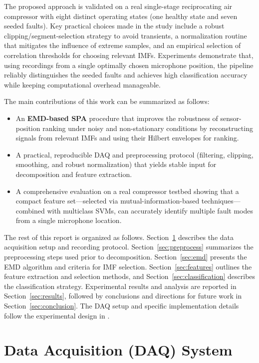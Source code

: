 \documentclass[12pt,a4paper]{article}
\begin{document}
The proposed approach is validated on a real single-stage reciprocating air compressor with eight distinct operating states (one healthy state and seven seeded faults). Key practical choices made in the study include a robust clipping/segment-selection strategy to avoid transients, a normalization routine that mitigates the influence of extreme samples, and an empirical selection of correlation thresholds for choosing relevant IMFs. Experiments demonstrate that, using recordings from a single optimally chosen microphone position, the pipeline reliably distinguishes the seeded faults and achieves high classification accuracy while keeping computational overhead manageable.

The main contributions of this work can be summarized as follows:
\begin{itemize}
  \item An \textbf{EMD-based SPA} procedure that improves the robustness of sensor-position ranking under noisy and non-stationary conditions by reconstructing signals from relevant IMFs and using their Hilbert envelopes for ranking.
  \item A practical, reproducible DAQ and preprocessing protocol (filtering, clipping, smoothing, and robust normalization) that yields stable input for decomposition and feature extraction.
  \item A comprehensive evaluation on a real compressor testbed showing that a compact feature set—selected via mutual-information-based techniques—combined with multiclass SVMs, can accurately identify multiple fault modes from a single microphone location.
\end{itemize}

The rest of this report is organized as follows. Section~\ref{sec:daq} describes the data acquisition setup and recording protocol. Section~\ref{sec:preprocess} summarizes the preprocessing steps used prior to decomposition. Section~\ref{sec:emd} presents the EMD algorithm and criteria for IMF selection. Section~\ref{sec:features} outlines the feature extraction and selection methods, and Section~\ref{sec:classification} describes the classification strategy. Experimental results and analysis are reported in Section~\ref{sec:results}, followed by conclusions and directions for future work in Section~\ref{sec:conclusion}. The DAQ setup and specific implementation details follow the experimental design in \cite{Verma2016}.

\section{Data Acquisition (DAQ) System}
\label{sec:daq}
\end{document}
